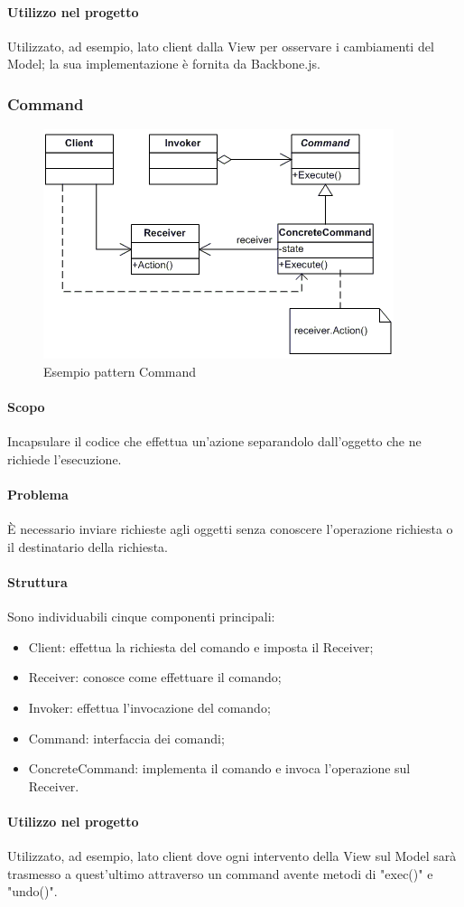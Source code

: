 \documentclass[../PianoDiQualifica.tex]{subfiles}
\begin{document}
				\paragraph{Utilizzo nel progetto\\}
					Utilizzato, ad esempio, lato client dalla View per osservare i cambiamenti del
					Model; la sua implementazione è fornita da Backbone.js.
			\subsubsection{Command}
				\begin{figure}[H] \label{fig:Command}
					\centering
					\includegraphics[scale=0.8]{Immagini/CommandEx.png}
					\caption{Esempio pattern Command}
				\end{figure}
				\paragraph{Scopo\\}
					Incapsulare il codice che effettua un'azione separandolo dall'oggetto che ne
					richiede l'esecuzione.
				\paragraph{Problema\\}
					È necessario inviare richieste agli oggetti senza conoscere l'operazione richiesta
					o il destinatario della richiesta.
				\paragraph{Struttura\\}
					Sono individuabili cinque componenti principali:
					\begin{itemize}
						\item Client: effettua la richiesta del comando e imposta il
						Receiver;
						\item Receiver: conosce come effettuare il comando; 
						\item Invoker: effettua l'invocazione del comando;
						\item Command: interfaccia dei comandi;
						\item ConcreteCommand: implementa il comando e invoca l'operazione sul Receiver.
					\end{itemize}
				\paragraph{Utilizzo nel progetto\\}
					Utilizzato, ad esempio, lato client dove ogni intervento della View sul Model sarà
					trasmesso a quest'ultimo attraverso un command avente metodi di "exec()" e "undo()".	
\end{document}
